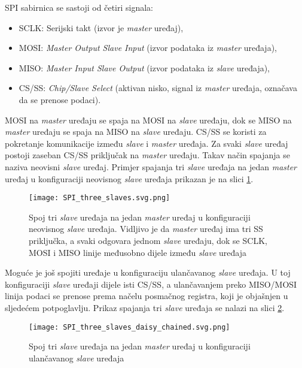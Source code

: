 SPI sabirnica se sastoji od četiri signala:
\begin{itemize}
	\item SCLK: Serijski takt (izvor je \textit{master} uređaj),
	\item MOSI: \textit{Master Output Slave Input} (izvor podataka iz \textit{master} uređaja),
	\item MISO: \textit{Master Input Slave Output} (izvor podataka iz \textit{slave} uređaja),
	\item CS/SS: \textit{Chip/Slave Select} (aktivan nisko, signal iz \textit{master} uređaja, označava da se prenose podaci).
\end{itemize}
MOSI na \textit{master} uređaju se spaja na MOSI na \textit{slave} uređaju, dok se MISO na \textit{master} uređaju se spaja na MISO na \textit{slave} uređaju. CS/SS se koristi za pokretanje komunikacije između \textit{slave} i \textit{master} uređaja. Za svaki \textit{slave} uređaj postoji zaseban CS/SS priključak na \textit{master} uređaju. Takav način spajanja se naziva neovisni \textit{slave} uređaj. Primjer spajanja tri \textit{slave} uređaja na jedan \textit{master} uređaj u konfiguraciji neovisnog \textit{slave} uređaja prikazan je na slici \ref{fig:spi_three_slaves}.
\begin{figure}[H]
	\centering
	\texttt{[image: SPI\_three\_slaves.svg.png]}
	\caption{Spoj tri \textit{slave} uređaja na jedan \textit{master} uređaj u konfiguraciji neovisnog \textit{slave} uređaja. Vidljivo je da \textit{master} uređaj ima tri SS priključka, a svaki odgovara jednom \textit{slave} uređaju, dok se SCLK, MOSI i MISO linije međusobno dijele između \textit{slave} uređaja \cite{spi_wikipedia}}
	\label{fig:spi_three_slaves}
\end{figure}
Moguće je još spojiti uređaje u konfiguraciju ulančavanog \textit{slave} uređaja. U toj konfiguraciji \textit{slave} uređaji dijele isti CS/SS, a ulančavanjem preko MISO/MOSI linija podaci se prenose prema načelu posmačnog registra, koji je objašnjen u sljedećem potpoglavlju. Prikaz spajanja tri \textit{slave} uređaja se nalazi na slici \ref{fig:SPI_three_slaves_daisy_chained}.
\begin{figure}[H]
	\centering
	\texttt{[image: SPI\_three\_slaves\_daisy\_chained.svg.png]}
	\caption{Spoj tri \textit{slave} uređaja na jedan \textit{master} uređaj u konfiguraciji ulančavanog \textit{slave} uređaja \cite{spi_wikipedia}}
	\label{fig:SPI_three_slaves_daisy_chained}
\end{figure}

